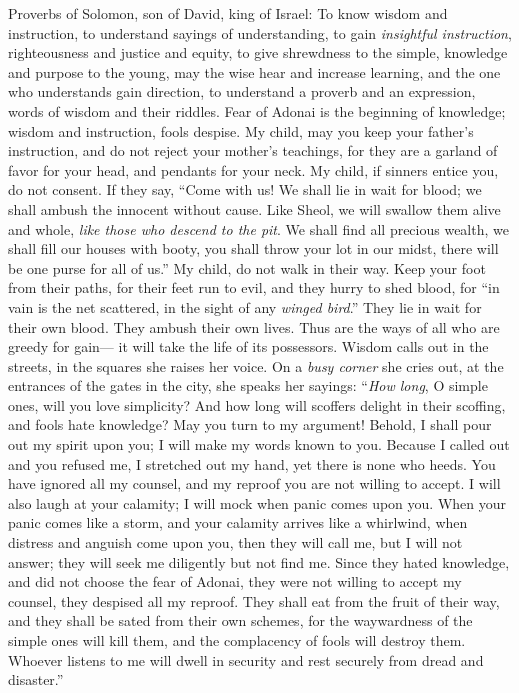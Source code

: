 
\begin{biblechapter} %
 Proverbs of Solomon, son of David, king of Israel:
\verse To know wisdom and instruction, 
to understand sayings of understanding,
\verse to gain \textit{insightful instruction}, 
righteousness and justice and equity,
\verse to give shrewdness to the simple, 
knowledge and purpose to the young,
\verse may the wise hear and increase learning, 
and the one who understands gain direction,
\verse to understand a proverb and an expression, 
words of wisdom and their riddles.
\verse Fear of Adonai is the beginning of knowledge; 
wisdom and instruction, fools despise.
 My child, may you keep your father’s instruction, 
and do not reject your mother’s teachings,
\verse for they are a garland of favor for your head, 
and pendants for your neck.
\verse My child, if sinners entice you, do not consent.
\verse If they say, 
“Come with us! 
We shall lie in wait for blood; 
we shall ambush the innocent without cause.
\verse Like Sheol, we will swallow them alive 
and whole, \textit{like those who descend to the pit}.
\verse We shall find all precious wealth, 
we shall fill our houses with booty,
\verse you shall throw your lot in our midst, 
there will be one purse for all of us.”
\verse My child, do not walk in their way. 
Keep your foot from their paths,
\verse for their feet run to evil, 
and they hurry to shed blood,
\verse for “in vain is the net scattered, 
in the sight of any \textit{winged bird}.”
\verse They lie in wait for their own blood. 
They ambush their own lives.
\verse Thus are the ways of all who are greedy for gain— 
it will take the life of its possessors.
 Wisdom calls out in the streets, 
in the squares she raises her voice.
\verse On a \textit{busy corner} she cries out, 
at the entrances of the gates in the city, she speaks her sayings:
\verse “\textit{How long}, O simple ones, will you love simplicity? 
And how long will scoffers delight in their scoffing, 
and fools hate knowledge?
\verse May you turn to my argument! 
Behold, I shall pour out my spirit upon you; 
I will make my words known to you.
\verse Because I called out and you refused me, 
I stretched out my hand, yet there is none who heeds.
\verse You have ignored all my counsel, 
and my reproof you are not willing to accept.
\verse I will also laugh at your calamity; 
I will mock when panic comes upon you.
\verse When your panic comes like a storm, 
and your calamity arrives like a whirlwind, 
when distress and anguish come upon you,
\verse then they will call me, but I will not answer; 
they will seek me diligently but not find me.
\verse Since they hated knowledge, 
and did not choose the fear of Adonai,
\verse they were not willing to accept my counsel, 
they despised all my reproof.
\verse They shall eat from the fruit of their way, 
and they shall be sated from their own schemes,
\verse for the waywardness of the simple ones will kill them, 
and the complacency of fools will destroy them.
\verse Whoever listens to me will dwell in security 
and rest securely from dread and disaster.”
\end{biblechapter}

